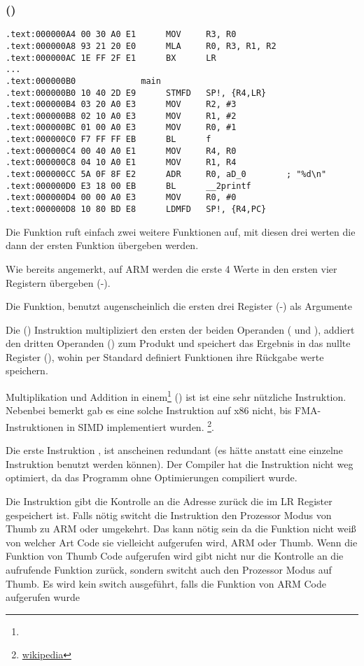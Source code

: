\subsubsection{\NonOptimizingKeilVI (\ARMMode)}

\begin{lstlisting}
.text:000000A4 00 30 A0 E1      MOV     R3, R0
.text:000000A8 93 21 20 E0      MLA     R0, R3, R1, R2
.text:000000AC 1E FF 2F E1      BX      LR
...
.text:000000B0             main
.text:000000B0 10 40 2D E9      STMFD   SP!, {R4,LR}
.text:000000B4 03 20 A0 E3      MOV     R2, #3
.text:000000B8 02 10 A0 E3      MOV     R1, #2
.text:000000BC 01 00 A0 E3      MOV     R0, #1
.text:000000C0 F7 FF FF EB      BL      f
.text:000000C4 00 40 A0 E1      MOV     R4, R0
.text:000000C8 04 10 A0 E1      MOV     R1, R4
.text:000000CC 5A 0F 8F E2      ADR     R0, aD_0        ; "%d\n"
.text:000000D0 E3 18 00 EB      BL      __2printf
.text:000000D4 00 00 A0 E3      MOV     R0, #0
.text:000000D8 10 80 BD E8      LDMFD   SP!, {R4,PC}
\end{lstlisting}

Die \main Funktion ruft einfach zwei weitere Funktionen auf, mit diesen drei werten die dann
der ersten Funktion übergeben werden.

Wie bereits angemerkt, auf ARM werden die erste 4 Werte in den ersten vier Registern übergeben (-).

Die \ttf Funktion, benutzt augenscheinlich die ersten drei Register (-) als Argumente


Die  ()
Instruktion multipliziert den ersten der beiden Operanden ( und ), addiert den dritten Operanden
() zum Produkt und speichert das Ergebnis in das nullte Register (), wohin per Standard definiert
Funktionen ihre Rückgabe werte speichern.

Multiplikation und Addition in einem\footnote{\WPMAO} ()
ist ist eine sehr nützliche Instruktion. Nebenbei bemerkt gab es eine solche Instruktion 
auf x86 nicht, bis FMA-Instruktionen in SIMD implementiert wurden.
\footnote{\href{http://go.yurichev.com/17103}{wikipedia}}.

Die erste Instruktion ,
ist anscheinen redundant (es hätte anstatt eine einzelne  Instruktion benutzt werden können).
Der Compiler hat die Instruktion nicht weg optimiert, da das Programm ohne Optimierungen compiliert wurde.


Die  Instruktion gibt die Kontrolle an die Adresse zurück die im \ac{LR} Register gespeichert ist.
Falls nötig switcht die Instruktion den Prozessor Modus von Thumb zu ARM oder umgekehrt.
Das kann nötig sein da die \ttf Funktion nicht weiß von welcher Art Code sie vielleicht aufgerufen wird,
ARM oder Thumb.
Wenn die Funktion von Thumb Code aufgerufen wird gibt  nicht nur 
die Kontrolle an die aufrufende Funktion zurück, sondern switcht auch den Prozessor Modus auf 
Thumb. Es wird kein switch ausgeführt, falls die Funktion von ARM Code aufgerufen wurde  
